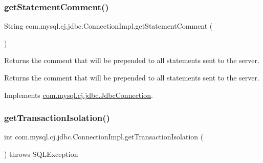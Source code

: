\mbox{\label{classcom_1_1mysql_1_1cj_1_1jdbc_1_1_connection_impl_a4ac13f311c3ef1e5e6718b17f3b5e090}} 
\subsubsection{\texorpdfstring{get\+Statement\+Comment()}{getStatementComment()}}
{\footnotesize\ttfamily String com.\+mysql.\+cj.\+jdbc.\+Connection\+Impl.\+get\+Statement\+Comment (\begin{DoxyParamCaption}{ }\end{DoxyParamCaption})}

Returns the comment that will be prepended to all statements sent to the server.

\begin{DoxyReturn}{Returns}
the comment that will be prepended to all statements sent to the server. 
\end{DoxyReturn}


Implements \mbox{\hyperlink{interfacecom_1_1mysql_1_1cj_1_1jdbc_1_1_jdbc_connection_a11233536b54479183feb8eda938f72e9}{com.\+mysql.\+cj.\+jdbc.\+Jdbc\+Connection}}.

\mbox{\label{classcom_1_1mysql_1_1cj_1_1jdbc_1_1_connection_impl_aa92a66e7ffd147ccf70a80fb47601760}} 
\subsubsection{\texorpdfstring{get\+Transaction\+Isolation()}{getTransactionIsolation()}}
{\footnotesize\ttfamily int com.\+mysql.\+cj.\+jdbc.\+Connection\+Impl.\+get\+Transaction\+Isolation (\begin{DoxyParamCaption}{ }\end{DoxyParamCaption}) throws S\+Q\+L\+Exception}

